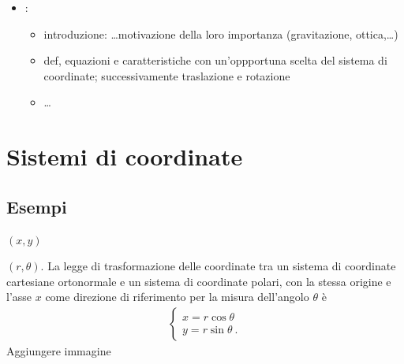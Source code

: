 \documentclass[letterpaper,10pt,english]{jupyterBook}
\begin{document}
\begin{itemize}
\begin{itemize}
\begin{itemize}
\item {} 
\sphinxAtStartPar
posizione relativa punto\sphinxhyphen{}retta, distanza punto\sphinxhyphen{}retta, posizione relativa retta\sphinxhyphen{}retta

\end{itemize}

\item {} 
\sphinxAtStartPar
{}:
\begin{itemize}
\item {} 
\sphinxAtStartPar
introduzione: …motivazione della loro importanza (gravitazione, ottica,…)

\item {} 
\sphinxAtStartPar
def, equazioni e caratteristiche con un’oppportuna scelta del sistema di coordinate; successivamente traslazione e rotazione

\item {} 
\sphinxAtStartPar
…

\end{itemize}

\end{itemize}

\end{itemize}

\sphinxstepscope


\section{Sistemi di coordinate}
\label{\detokenize{ch/analytic_geometry/analytic_geometry_2d/coordinates:sistemi-di-coordinate}}\label{\detokenize{ch/analytic_geometry/analytic_geometry_2d/coordinates:geometry-analytic-2d-coordinates}}\label{\detokenize{ch/analytic_geometry/analytic_geometry_2d/coordinates::doc}}

\subsection{Esempi}
\label{\detokenize{ch/analytic_geometry/analytic_geometry_2d/coordinates:esempi}}
\sphinxAtStartPar
{} \((x, y)\)

\sphinxAtStartPar
{} \((r, \theta)\). La legge di trasformazione delle coordinate tra un sistema di coordinate cartesiane ortonormale e un sistema di coordinate polari, con la stessa origine e l’asse \(x\) come direzione di riferimento per la misura dell’angolo \(\theta\) è
\begin{equation*}
\begin{split}\begin{cases}
  x = r \cos \theta \\
  y = r \sin \theta \ .
\end{cases}\end{split}
\end{equation*}
\sphinxAtStartPar
{} Aggiungere immagine
\end{document}
